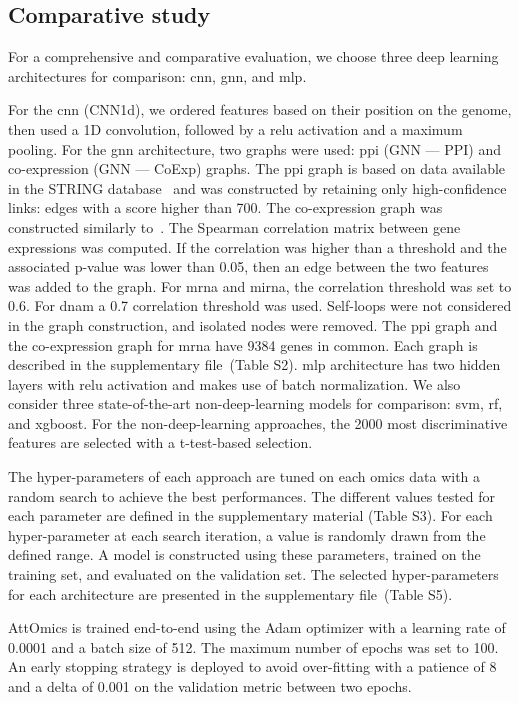 \documentclass[../main.tex]{subfiles}
\begin{document}
 \subsection{Comparative study}
	 For a comprehensive and comparative evaluation, we choose three deep learning architectures for comparison: \gls{cnn}, \gls{gnn}, and \gls{mlp}.

	 For the \gls{cnn} (CNN1d), we ordered features based on their position on the genome, then used a 1D convolution, followed by a \gls{relu} activation and a maximum pooling.
	 For the \gls{gnn} architecture, two graphs were used: \gls{ppi} (GNN --- PPI) and co-expression (GNN --- CoExp) graphs.
	 The \gls{ppi} graph is based on data available in the STRING database~\cite{Szklarczyk2020} and was constructed by retaining only high-confidence links: edges with a score higher than 700.
	 The co-expression graph was constructed similarly to~\cite{ramirezClassificationCancerTypes2020}.
	 The Spearman correlation matrix between gene expressions was computed.
	 If the correlation was higher than a threshold and the associated p-value was lower than 0.05, then an edge between the two features was added to the graph.
	 For \gls{mrna} and \gls{mirna}, the correlation threshold was set to 0.6.
	 For \gls{dnam} a 0.7 correlation threshold was used.
	 Self-loops were not considered in the graph construction, and isolated nodes were removed.
	 The \gls{ppi} graph and the co-expression graph for \gls{mrna} have 9384 genes in common.
	 Each graph is described in the supplementary file~(Table S2).
	 \Gls{mlp} architecture has two hidden layers with \gls{relu} activation and makes use of batch normalization.
	 We also consider three state-of-the-art non-deep-learning models for comparison: \gls{svm}, \gls{rf}, and \gls{xgboost}.
	 For the non-deep-learning approaches, the 2000 most discriminative features are selected with a t-test-based selection.

	 The hyper-parameters of each approach are tuned on each omics data with a random search to achieve the best performances.
	 The different values tested for each parameter are defined in the supplementary material (Table S3).
	 For each hyper-parameter at each search iteration, a value is randomly drawn from the defined range.
	 A model is constructed using these parameters, trained on the training set, and evaluated on the validation set.
	 The selected hyper-parameters for each architecture are presented in the supplementary file~(Table S5).

	 AttOmics is trained end-to-end using the Adam optimizer with a learning rate of 0.0001 and a batch size of 512.
	 The maximum number of epochs was set to 100.
	 An early stopping strategy is deployed to avoid over-fitting with a patience of 8 and a delta of 0.001 on the validation metric between two epochs.
\end{document}
